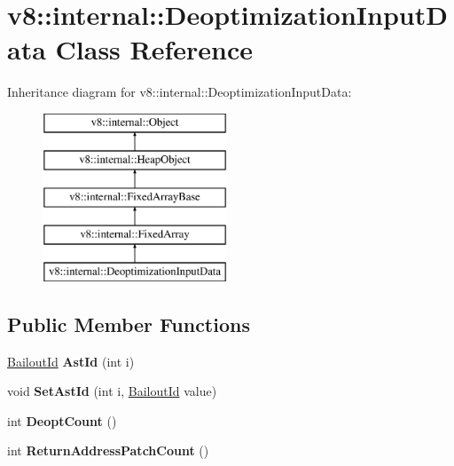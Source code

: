 \hypertarget{classv8_1_1internal_1_1_deoptimization_input_data}{}\section{v8\+:\+:internal\+:\+:Deoptimization\+Input\+Data Class Reference}
\label{classv8_1_1internal_1_1_deoptimization_input_data}
Inheritance diagram for v8\+:\+:internal\+:\+:Deoptimization\+Input\+Data\+:\begin{figure}[H]
\begin{center}
\leavevmode
\includegraphics[height=5.000000cm]{classv8_1_1internal_1_1_deoptimization_input_data}
\end{center}
\end{figure}
\subsection*{Public Member Functions}
\begin{DoxyCompactItemize}
\item 
\hypertarget{classv8_1_1internal_1_1_deoptimization_input_data_a6e55f0971340b1c28b951a930438db2a}{}\hyperlink{classv8_1_1internal_1_1_bailout_id}{Bailout\+Id} {\bfseries Ast\+Id} (int i)\label{classv8_1_1internal_1_1_deoptimization_input_data_a6e55f0971340b1c28b951a930438db2a}

\item 
\hypertarget{classv8_1_1internal_1_1_deoptimization_input_data_a798ba9707bc798f3da80f8dd422609e3}{}void {\bfseries Set\+Ast\+Id} (int i, \hyperlink{classv8_1_1internal_1_1_bailout_id}{Bailout\+Id} value)\label{classv8_1_1internal_1_1_deoptimization_input_data_a798ba9707bc798f3da80f8dd422609e3}

\item 
\hypertarget{classv8_1_1internal_1_1_deoptimization_input_data_a863833fedc035ce852640d71a51b8ca7}{}int {\bfseries Deopt\+Count} ()\label{classv8_1_1internal_1_1_deoptimization_input_data_a863833fedc035ce852640d71a51b8ca7}

\item 
\hypertarget{classv8_1_1internal_1_1_deoptimization_input_data_a9531787083a3dae8e916a8205bc749c3}{}int {\bfseries Return\+Address\+Patch\+Count} ()\label{classv8_1_1internal_1_1_deoptimization_input_data_a9531787083a3dae8e916a8205bc749c3}

\end{DoxyCompactItemize}
